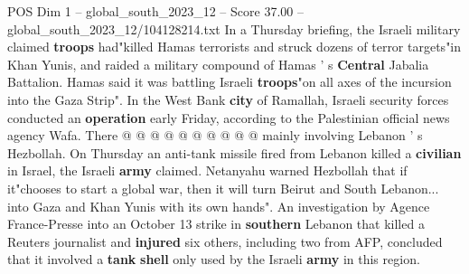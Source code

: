\begin{textsample}{POS Dim 1 – global\_south\_2023\_12 – Score 37.00 – global\_south\_2023\_12/104128214.txt}
In a Thursday briefing, the Israeli military claimed \textbf{troops} had"killed Hamas terrorists and struck dozens of terror targets"in Khan Yunis, and raided a military compound of Hamas ' s \textbf{Central} Jabalia Battalion.
Hamas said it was battling Israeli \textbf{troops}"on all axes of the incursion into the Gaza Strip".
In the West Bank \textbf{city} of Ramallah, Israeli security forces conducted an \textbf{operation} early Friday, according to the Palestinian official news agency Wafa.
There @ @ @ @ @ @ @ @ @ @ mainly involving Lebanon ' s Hezbollah.
On Thursday an anti-tank missile fired from Lebanon killed a \textbf{civilian} in Israel, the Israeli \textbf{army} claimed.
Netanyahu warned Hezbollah that if it"chooses to start a global war, then it will turn Beirut and South Lebanon... into Gaza and Khan Yunis with its own hands".
An investigation by Agence France-Presse into an October 13 strike in \textbf{southern} Lebanon that killed a Reuters journalist and \textbf{injured} six others, including two from AFP, concluded that it involved a \textbf{tank} \textbf{shell} only used by the Israeli \textbf{army} in this region.

\end{textsample}
